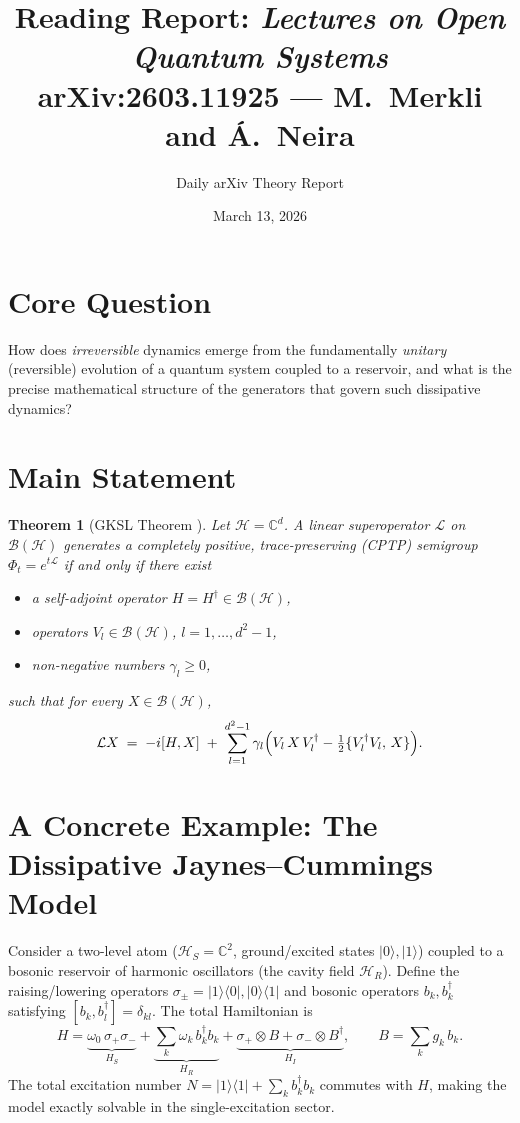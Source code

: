 \documentclass[11pt,a4paper]{article}
\title{Reading Report: \emph{Lectures on Open Quantum Systems}\\[4pt]
\large arXiv:2603.11925 --- M.~Merkli and \'A.~Neira}
\author{Daily arXiv Theory Report}
\date{March 13, 2026}
\newtheorem{theorem}{Theorem}
\begin{document}
\maketitle

\section{Core Question}

How does \emph{irreversible} dynamics emerge from the fundamentally \emph{unitary} (reversible) evolution of a quantum system coupled to a reservoir, and what is the precise mathematical structure of the generators that govern such dissipative dynamics?

\section{Main Statement}

\begin{theorem}[GKSL Theorem {\cite[Thm.~3]{paper}}]
Let $\mathcal{H}=\mathbb{C}^d$.  A linear superoperator $\mathcal{L}$ on $\mathcal{B}(\mathcal{H})$ generates a completely positive, trace-preserving (CPTP) semigroup $\Phi_t = e^{t\mathcal{L}}$ if and only if there exist
\begin{itemize}[nosep]
  \item a self-adjoint operator $H = H^\dagger \in \mathcal{B}(\mathcal{H})$,
  \item operators $V_l \in \mathcal{B}(\mathcal{H})$, $l=1,\dots,d^2-1$,
  \item non-negative numbers $\gamma_l \ge 0$,
\end{itemize}
such that for every $X \in \mathcal{B}(\mathcal{H})$,
\[
  \mathcal{L}X \;=\; -i[H,X]
    \;+\;\sum_{l=1}^{d^2-1} \gamma_l
      \Bigl(V_l\, X\, V_l^\dagger
        - \tfrac{1}{2}\{V_l^\dagger V_l,\, X\}\Bigr).
\]
\end{theorem}

\section{A Concrete Example: The Dissipative Jaynes--Cummings Model}

Consider a two-level atom ($\mathcal{H}_S = \mathbb{C}^2$, ground/excited states $|0\rangle,|1\rangle$) coupled to a bosonic reservoir of harmonic oscillators (the cavity field $\mathcal{H}_R$).  Define the raising/lowering operators $\sigma_\pm = |1\rangle\langle 0|, |0\rangle\langle 1|$ and bosonic operators $b_k, b_k^\dagger$ satisfying $[b_k, b_l^\dagger] = \delta_{kl}$.  The total Hamiltonian is
\[
  H = \underbrace{\omega_0\,\sigma_+\sigma_-}_{H_S}
    + \underbrace{\sum_k \omega_k\, b_k^\dagger b_k}_{H_R}
    + \underbrace{\sigma_+ \otimes B + \sigma_- \otimes B^\dagger}_{H_I},
  \qquad B = \sum_k g_k\, b_k.
\]
The total excitation number $N = |1\rangle\langle 1| + \sum_k b_k^\dagger b_k$ commutes with $H$, making the model exactly solvable in the single-excitation sector.
\end{document}

